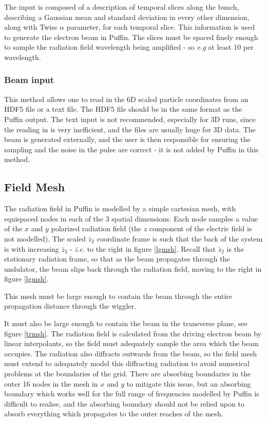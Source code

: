 \documentclass[12pt]{article}%
\begin{document}
The input is composed of a description of temporal slices along the bunch, describing a Gaussian mean and standard deviation in every other dimension, along with Twiss $\alpha$ parameter, for each temporal slice. This information is used to generate the electron beam in Puffin. The slices must be spaced finely enough to sample the radiation field wavelength being amplified - so \textit{e.g} at least 10 per wavelength.

\subsubsection{Beam input}

This method allows one to read in the 6D scaled particle coordinates from an HDF5 file or a text file. The HDF5 file should be in the same format as the Puffin output. The text input is not recommended, especially for 3D runs, since the reading in is very inefficient, and the files are usually huge for 3D data. The beam is generated externally, and the user is then responsible for ensuring the sampling and the noise in the pulse are correct - it is not added by Puffin in this method.


\subsection{Field Mesh}


The radiation field in Puffin is modelled by a simple cartesian mesh, with equispaced nodes in each of the 3 spatial dimensions. Each node samples a value of the $x$ and $y$ polarized radiation field (the $z$ component of the electric field is not modelled). The scaled $\bar{z}_2$ coordinate frame is such that the back of the system is with increasing $\bar{z}_2$ - \textit{i.e.} to the right in figure \ref{lgmsh}. Recall that $\bar{z}_2$ is the stationary radiation frame, so that as the beam propagates through the undulator, the beam slips back through the radiation field, moving to the right in figure \ref{lgmsh}.

This mesh must be large enough to contain the beam through the entire propagation distance through the wiggler.

It must also be large enough to contain the beam in the transverse plane, see figure \ref{trmsh}. The radiation field is calculated from the driving electron beam by linear interpolants, so the field must adequately sample the area which the beam occupies.  The radiation also diffracts outwards from the beam, so the field mesh must extend to adequately model this diffracting radiation to avoid numerical problems at the boundaries of the grid. There are absorbing boundaries in the outer 16 nodes in the mesh in $x$ and $y$ to mitigate this issue, but an absorbing boundary which works well for the full range of frequencies modelled by Puffin is difficult to realise, and the absorbing boundary should not be relied upon to absorb everything which propagates to the outer reaches of the mesh.
\end{document}

